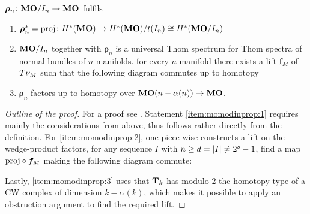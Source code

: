 \begin{Thm*}
  $\bm{\rho}_n\colon\bm{\mathrm{MO}}/I_{n}\to\bm{\mathrm{MO}}$ fulfils 
  \begin{enumerate}
  \item\label{item:momodinprop:1}
    ${\bm{\rho}}^*_n=\mathrm{proj}\colon
    H^*(\bm{\mathrm{MO}})
    \to H^*(\bm{\mathrm{MO}})/t(I_{n})\cong H^*(\bm{\mathrm{MO}}/I_{n})$
  \item\label{item:momodinprop:2}
    $\bm{\mathrm{MO}}/I_{n}$ together with $\bm{\rho}_n$ is a universal Thom spectrum
    for Thom spectra of normal bundles of $n$-manifolds.
    \Idest for every $n$-manifold there exists a lift $\bm{f}_M$ of
    $T{\nu_{M}}$ 
    such that the following diagram commutes up to homotopy
    \begin{center}
    \end{center}
  \item\label{item:momodinprop:3}
    $\bm{\rho}_n$ factors up to homotopy over
    $\bm{\mathrm{MO}}(n-\alpha(n))\to\bm{\mathrm{MO}}$.
  \end{enumerate}
  \begin{proof}[Outline of the proof]
    For a proof see \cite[Lemma~2.28, Theorem~2.29]{immersionconj}.
    Statement \ref{item:momodinprop:1} requires mainly the
    considerations from above, thus follows rather directly from the
    definition.
    For \ref{item:momodinprop:2}, one piece-wise constructs a lift on
    the wedge-product factors, \idest for any
    sequence $I$ with $n\geq d=\left|I\right|\neq2^s-1$, find a map
    $\mathrm{proj}\circ\bm{f}_M$ making the following diagram commute:
    \begin{center}
    \end{center}
    Lastly, \ref{item:momodinprop:3} uses that $\bm{\mathrm{T}}{}_{k}$ has
    modulo 2 the homotopy type of a CW complex of dimension $k-\alpha(k)$,
    which makes it possible to apply an obstruction argument to find
    the required lift.
  \end{proof}
\end{Thm*}

